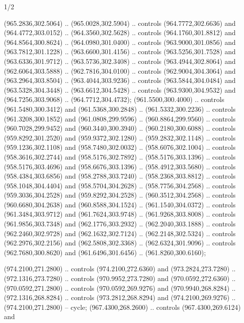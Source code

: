 \begin{flagdescription}{1/2}
\begin{scope}[xshift=0.75\flaglength,yshift=0.5\flagwidth,scale=0.00293\flagwidth]
\begin{scope}[scale=0.675,y=0.80pt, x=0.80pt,yscale=-1,xshift=-720,yshift=-240]
\begin{scope}[miter limit=4.80]
\begin{scope}[draw=black,fill=brown,line width=0.336\lw]
  (965.2836,302.5064) .. (965.0028,302.5904) .. controls (964.7772,302.6636) and
  (964.4772,303.0152) .. (964.3560,302.5628) .. controls (964.1760,301.8812) and
  (964.8564,300.8624) .. (964.0980,301.0400) .. controls (963.9000,301.0856) and
  (963.7812,301.1228) .. (963.6600,301.4156) .. controls (963.5256,301.7528) and
  (963.6336,301.9712) .. (963.5736,302.3408) .. controls (963.4944,302.8064) and
  (962.6064,303.5888) .. (962.7816,304.0100) .. controls (962.9004,304.3064) and
  (963.2964,303.8504) .. (963.4044,303.9236) .. controls (963.5844,304.0484) and
  (963.5328,304.3448) .. (963.6612,304.5428) .. controls (963.9300,304.9532) and
  (964.7256,303.9068) .. (964.7712,304.4732);
 (961.5500,300.4000) .. controls (961.5480,300.3412) and
  (961.5368,300.2848) .. (961.5332,300.2236) .. controls (961.3208,300.1852) and
  (961.0808,299.9596) .. (960.8864,299.9560) .. controls (960.7028,299.9452) and
  (960.3440,300.3940) .. (960.2180,300.6088) .. controls (959.8292,301.2520) and
  (959.9372,302.1280) .. (959.2832,302.1148) .. controls (959.1236,302.1108) and
  (958.7480,302.0032) .. (958.6076,302.1004) .. controls (958.3616,302.2744) and
  (958.5176,302.7892) .. (958.5176,303.1396) .. controls (958.5176,303.4696) and
  (958.6676,303.1396) .. (958.4912,303.5680) .. controls (958.4384,303.6856) and
  (958.2788,303.7240) .. (958.2368,303.8812) .. controls (958.1048,304.4404) and
  (958.5704,304.2628) .. (958.7756,304.2568) .. controls (959.3036,304.2528) and
  (959.8292,304.2528) .. (960.3512,304.2568) .. controls (960.6680,304.2638) and
  (960.8588,304.1524) .. (961.1540,304.0372) .. controls (961.3484,303.9712) and
  (961.7624,303.9748) .. (961.9268,303.8008) .. controls (961.9856,303.7348) and
  (962.1776,303.2932) .. (962.2040,303.1888) .. controls (962.2460,302.9728) and
  (962.1632,302.7124) .. (962.2148,302.5324) .. controls (962.2976,302.2156) and
  (962.5808,302.3368) .. (962.6324,301.9096) .. controls (962.7680,300.8620) and
  (961.6496,301.6456) .. (961.8260,300.6160);
\end{scope}
\begin{scope}[draw=black,fill=black,line width=0.624\lw]
 (974.2100,271.2800) .. controls (974.2100,272.6360) and
  (973.2824,273.7280) .. (972.1316,273.7280) .. controls (970.9952,273.7280) and
  (970.0592,272.6360) .. (970.0592,271.2800) .. controls (970.0592,269.9276) and
  (970.9940,268.8284) .. (972.1316,268.8284) .. controls (973.2812,268.8294) and
  (974.2100,269.9276) .. (974.2100,271.2800) -- cycle;
 (967.4300,268.2600) .. controls (967.4300,269.6124) and

\end{scope}
\end{scope}
\end{scope}
\end{scope}
\end{flagdescription}
